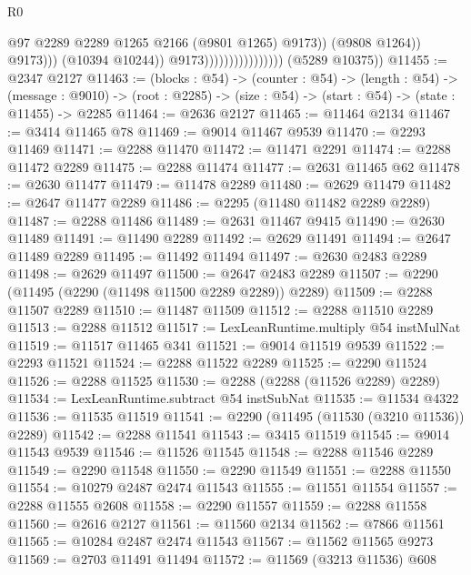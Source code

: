 \begin{lexlean}{R0}
\begin{coremodule}
                                                    @97
                                                    @2289
                                                    @2289
                                                    @1265
                                                    @2166
                                                    (@9801 @1265)
                                                    @9173))
                                                (@9808 @1264))
                                              @9173)))
                                        (@10394 @10244))
                                      @9173))))))))))))))))
      (@5289 @10375))
@11455 := @2347 @2127
@11463 := (blocks : @54) ->
  (counter : @54) ->
  (length : @54) ->
  (message : @9010) -> (root : @2285) -> (size : @54) -> (start : @54) -> (state : @11455) -> @2285
@11464 := @2636 @2127
@11465 := @11464 @2134
@11467 := @3414 @11465 @78
@11469 := @9014 @11467 @9539
@11470 := @2293 @11469
@11471 := @2288 @11470
@11472 := @11471 @2291
@11474 := @2288 @11472 @2289
@11475 := @2288 @11474
@11477 := @2631 @11465 @62
@11478 := @2630 @11477
@11479 := @11478 @2289
@11480 := @2629 @11479
@11482 := @2647 @11477 @2289
@11486 := @2295 (@11480 @11482 @2289 @2289)
@11487 := @2288 @11486
@11489 := @2631 @11467 @9415
@11490 := @2630 @11489
@11491 := @11490 @2289
@11492 := @2629 @11491
@11494 := @2647 @11489 @2289
@11495 := @11492 @11494
@11497 := @2630 @2483 @2289
@11498 := @2629 @11497
@11500 := @2647 @2483 @2289
@11507 := @2290 (@11495 (@2290 (@11498 @11500 @2289 @2289)) @2289)
@11509 := @2288 @11507 @2289
@11510 := @11487 @11509
@11512 := @2288 @11510 @2289
@11513 := @2288 @11512
@11517 := LexLeanRuntime.multiply @54 instMulNat
@11519 := @11517 @11465 @341
@11521 := @9014 @11519 @9539
@11522 := @2293 @11521
@11524 := @2288 @11522 @2289
@11525 := @2290 @11524
@11526 := @2288 @11525
@11530 := @2288 (@2288 (@11526 @2289) @2289)
@11534 := LexLeanRuntime.subtract @54 instSubNat
@11535 := @11534 @4322
@11536 := @11535 @11519
@11541 := @2290 (@11495 (@11530 (@3210 @11536)) @2289)
@11542 := @2288 @11541
@11543 := @3415 @11519
@11545 := @9014 @11543 @9539
@11546 := @11526 @11545
@11548 := @2288 @11546 @2289
@11549 := @2290 @11548
@11550 := @2290 @11549
@11551 := @2288 @11550
@11554 := @10279 @2487 @2474 @11543
@11555 := @11551 @11554
@11557 := @2288 @11555 @2608
@11558 := @2290 @11557
@11559 := @2288 @11558
@11560 := @2616 @2127
@11561 := @11560 @2134
@11562 := @7866 @11561
@11565 := @10284 @2487 @2474 @11543
@11567 := @11562 @11565 @9273
@11569 := @2703 @11491 @11494
@11572 := @11569 (@3213 @11536) @608

\end{coremodule}
\end{lexlean}

